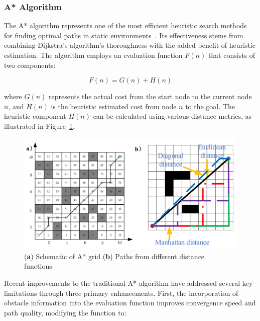 \newpage

\subsubsection{A* Algorithm}
The A* algorithm represents one of the most efficient heuristic search methods for finding optimal paths in static environments~\cite{gul2019comprehensive}. Its effectiveness stems from combining Dijkstra's algorithm's thoroughness with the added benefit of heuristic estimation. The algorithm employs an evaluation function \(F(n)\) that consists of two components:

\begin{equation}
    F(n) = G(n) + H(n)
\end{equation}

\noindent where \(G(n)\) represents the actual cost from the start node to the current node \(n\), and \(H(n)\) is the heuristic estimated cost from node \(n\) to the goal. The heuristic component \(H(n)\) can be calculated using various distance metrics, as illustrated in Figure~\ref{fig:astar_distances}.

\begin{figure}[H]
    \centering
    \includegraphics[width=5.5in]{pics/astar_distances.png}
    \caption[Schematic diagram of grid method and paths generated by different distance functions]{(\textbf{a}) Schematic of A* grid (\textbf{b}) Paths from different distance functions~\cite{xiang2022combined}}\label{fig:astar_distances}
\end{figure}

\noindent Recent improvements to the traditional A* algorithm have addressed several key limitations
through three primary enhancements. First, the incorporation of obstacle information into the 
evaluation function improves convergence speed and path quality, modifying the function to:

